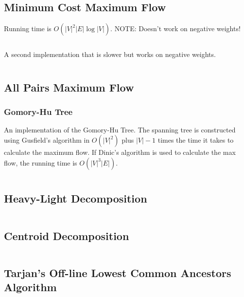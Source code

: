 \documentclass[9pt,a4paper,twocolumn,landscape,oneside]{amsart}
\newcommand{\code}[1]{\inputminted{cpp}{_code/#1}}
\newif\ifverbose
\begin{document}
    \subsection{Minimum Cost Maximum Flow}
        \ifverbose
        An implementation of Edmonds Karp's algorithm, modified to find
        shortest path to augment each time (instead of just any path). It
        computes the maximum flow of a flow network, and when there are
        multiple maximum flows, finds the maximum flow with minimum cost.
        \fi
        Running time is $O(|V|^2|E|\log|V|)$. NOTE: Doesn't work on negative
        weights!
        \code{graph/edmonds_karps_mcmf.cpp}

        A second implementation that is slower but works on negative weights.
        \code{graph/mcmf_old.cpp}

    \subsection{All Pairs Maximum Flow}
        \subsubsection{Gomory-Hu Tree}
        An implementation of the Gomory-Hu Tree. The spanning tree is constructed using Gusfield's algorithm
        in $O(|V| ^ 2)$ plus $|V|-1$ times the time it takes to calculate the maximum flow.
        If Dinic's algorithm is used to calculate the max flow, the running time is $O(|V|^3|E|)$.
        \code{graph/gomory_hu_tree.cpp}

    \subsection{Heavy-Light Decomposition}
        \code{graph/hld.cpp}

    \subsection{Centroid Decomposition}
        \code{graph/centroid_decomposition.cpp}

    \subsection{Tarjan's Off-line Lowest Common Ancestors Algorithm}
        \code{graph/tarjan_olca.cpp}
\end{document}
